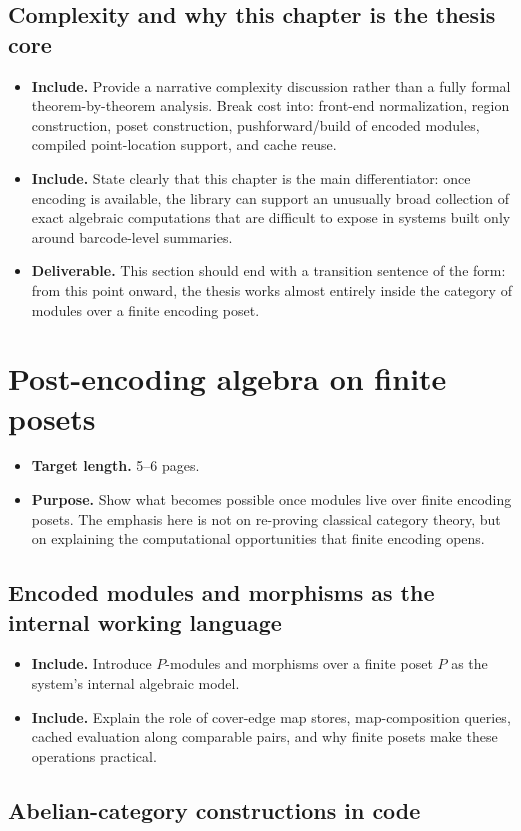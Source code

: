 \documentclass[11pt]{article}
\newenvironment{plan}{\begin{itemize}[leftmargin=1.6em,itemsep=0.35em,topsep=0.25em]}{\end{itemize}}
\newcommand{\target}[1]{\item \textbf{Target length.} #1}
\newcommand{\purpose}[1]{\item \textbf{Purpose.} #1}
\newcommand{\includeitems}[1]{\item \textbf{Include.} #1}
\newcommand{\deliverable}[1]{\item \textbf{Deliverable.} #1}
\begin{document}
\subsection{Complexity and why this chapter is the thesis core}

\begin{plan}
    \includeitems{Provide a narrative complexity discussion rather than a fully formal theorem-by-theorem analysis. Break cost into: front-end normalization, region construction, poset construction, pushforward/build of encoded modules, compiled point-location support, and cache reuse.}
    \includeitems{State clearly that this chapter is the main differentiator: once encoding is available, the library can support an unusually broad collection of exact algebraic computations that are difficult to expose in systems built only around barcode-level summaries.}
    \deliverable{This section should end with a transition sentence of the form: from this point onward, the thesis works almost entirely inside the category of modules over a finite encoding poset.}
\end{plan}

\section{Post-encoding algebra on finite posets}\label{sec:post-encoding-algebra}

\begin{plan}
    \target{5--6 pages.}
    \purpose{Show what becomes possible once modules live over finite encoding posets. The emphasis here is not on re-proving classical category theory, but on explaining the computational opportunities that finite encoding opens.}
\end{plan}

\subsection{Encoded modules and morphisms as the internal working language}

\begin{plan}
    \includeitems{Introduce $P$-modules and morphisms over a finite poset $P$ as the system's internal algebraic model.}
    \includeitems{Explain the role of cover-edge map stores, map-composition queries, cached evaluation along comparable pairs, and why finite posets make these operations practical.}
\end{plan}

\subsection{Abelian-category constructions in code}
\end{document}
